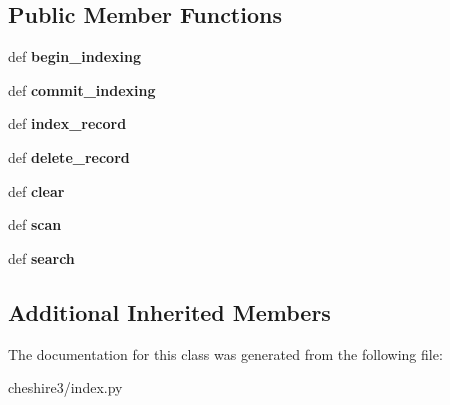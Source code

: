 \subsection*{Public Member Functions}
\begin{DoxyCompactItemize}
\item 
\hypertarget{classcheshire3_1_1index_1_1_record_identifier_index_ab380973a5df9ed2364d4dc160bebf1ca}{def {\bfseries begin\-\_\-indexing}}\label{classcheshire3_1_1index_1_1_record_identifier_index_ab380973a5df9ed2364d4dc160bebf1ca}

\item 
\hypertarget{classcheshire3_1_1index_1_1_record_identifier_index_af578fc4a493f000485b0cda66e59b917}{def {\bfseries commit\-\_\-indexing}}\label{classcheshire3_1_1index_1_1_record_identifier_index_af578fc4a493f000485b0cda66e59b917}

\item 
\hypertarget{classcheshire3_1_1index_1_1_record_identifier_index_a7483122009cd3f2d6f0689199275c942}{def {\bfseries index\-\_\-record}}\label{classcheshire3_1_1index_1_1_record_identifier_index_a7483122009cd3f2d6f0689199275c942}

\item 
\hypertarget{classcheshire3_1_1index_1_1_record_identifier_index_a7bce739fa8eb9ceacad11bf042b20be4}{def {\bfseries delete\-\_\-record}}\label{classcheshire3_1_1index_1_1_record_identifier_index_a7bce739fa8eb9ceacad11bf042b20be4}

\item 
\hypertarget{classcheshire3_1_1index_1_1_record_identifier_index_a45ce9b9d9eb0cad141f6be8b48ababf0}{def {\bfseries clear}}\label{classcheshire3_1_1index_1_1_record_identifier_index_a45ce9b9d9eb0cad141f6be8b48ababf0}

\item 
\hypertarget{classcheshire3_1_1index_1_1_record_identifier_index_a7517db29118d48c70cfddc1e14e28fb3}{def {\bfseries scan}}\label{classcheshire3_1_1index_1_1_record_identifier_index_a7517db29118d48c70cfddc1e14e28fb3}

\item 
\hypertarget{classcheshire3_1_1index_1_1_record_identifier_index_aaae244f5c15a7a437697e53150397307}{def {\bfseries search}}\label{classcheshire3_1_1index_1_1_record_identifier_index_aaae244f5c15a7a437697e53150397307}

\end{DoxyCompactItemize}
\subsection*{Additional Inherited Members}


The documentation for this class was generated from the following file\-:\begin{DoxyCompactItemize}
\item 
cheshire3/index.\-py\end{DoxyCompactItemize}
